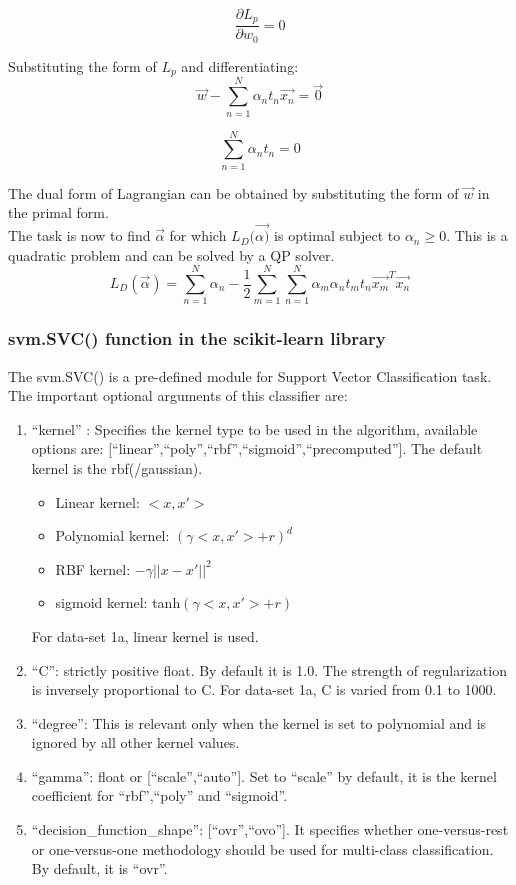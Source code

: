\documentclass[11pt,a4paper]{article}
\newcommand{\noi}{\noindent}
\begin{document}
\begin{equation}
    \frac{\partial L_p}{\partial w_0}=0
\end{equation}

\noi
Substituting the form of $L_p$ and differentiating:
\begin{equation}
    \vec{w}-\sum_{n=1}^{N}\alpha_nt_n\vec{x_n}=\vec{0}
\end{equation}

\begin{equation}
    \sum_{n=1}^{N}\alpha_nt_n=0
\end{equation}

\noi
The dual form of Lagrangian can be obtained by substituting the form of $\vec{w}$ in the primal form.\\ 
The task is now to find $\vec{\alpha}$ for which $L_D(\vec{\alpha)}$ is optimal subject to $\alpha_n\geq 0$. This is a quadratic problem and can be solved by a QP solver.
\begin{equation}
    L_D(\vec{\alpha})=\sum_{n=1}^{N}\alpha_n-\frac{1}{2}\sum_{m=1}^{N}\sum_{n=1}^{N}\alpha_m\alpha_nt_mt_n\vec{x_m}^T\vec{x_n} 
\end{equation}

\subsubsection{svm.SVC() function in the scikit-learn library}\label{subsubsection:svm module}
The svm.SVC() is a pre-defined module for Support Vector Classification task. The important optional arguments of this classifier are: 
\begin{enumerate}
    \item ``kernel'' : Specifies the kernel type to be used in the algorithm, available options are: [``linear'',``poly'',``rbf'',``sigmoid'',``precomputed''].
    The default kernel is the rbf(/gaussian). 
    \begin{itemize}
        \item Linear kernel: $<x,x'>$
        \item Polynomial kernel: $(\gamma<x,x'>+r)^{d}$
        \item RBF kernel: $-\gamma||x-x'||^{2}$
        \item sigmoid kernel: tanh$(\gamma<x,x'>+r)$
    \end{itemize} 
    For data-set 1a, linear kernel is used. 
    \item ``C'': strictly positive float. By default it is 1.0. The strength of regularization is inversely proportional to C. For data-set 1a, C is varied from 0.1 to 1000. 
    \item ``degree'': This is relevant only when the kernel is set to polynomial and is ignored by all other kernel values.
    \item ``gamma'': float or [``scale'',``auto'']. Set to ``scale'' by default, it is the kernel coefficient for ``rbf'',``poly'' and ``sigmoid''.
    \item ``decision\_function\_shape'': [``ovr'',``ovo'']. It specifies whether one-versus-rest or one-versus-one methodology should be used for multi-class classification. By default, it is ``ovr''. 
\end{enumerate}
\end{document}
